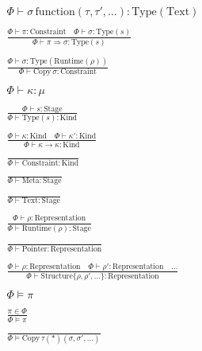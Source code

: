 \documentclass {article}
\begin{document}
\begin{gather*}
{\Phi \vdash \sigma \, \text{function} (\tau, \tau', \dots) : \text{Type} (\text{Text})} \\
\\
\frac
{\Phi \vdash \pi : \text{Constraint} \quad \Phi \vdash \sigma : \text{Type}(s)}
{\Phi \vdash \pi \Rightarrow \sigma : \text{Type}(s)} \\
\\
\frac
{\Phi \vdash \sigma : \text{Type}(\text{Runtime}(\rho))}
{\Phi \vdash \text{Copy} \, \sigma : \text{Constraint}} \\
\\
\Phi \vdash \kappa : \mu \tag*{[Kind Validation]} \\
\\
\frac
{\Phi \vdash s : \text{Stage}}
{\Phi \vdash \text {Type} (s) : \text{Kind}} \\
\\
\frac
{\Phi \vdash \kappa : \text{Kind} \quad \Phi \vdash \kappa' : \text{Kind}}
{\Phi \vdash \kappa \to \kappa : \text{Kind} } \\
\\
\frac
{}
{\Phi \vdash \text{Constraint} : \text{Kind}} \\
\\
\frac
{}
{\Phi \vdash \text{Meta} : \text{Stage}} \\
\\
\frac
{}
{\Phi \vdash \text{Text} : \text{Stage}} \\
\\
\frac
{\Phi \vdash \rho : \text{Representation}}
{\Phi \vdash \text{Runtime} (\rho) : \text{Stage}} \\
\\
\frac
{}
{\Phi \vdash \text{Pointer} : \text{Representation}} \\
\\
\frac
{\Phi \vdash \rho : \text{Representation} \quad \Phi \vdash \rho' : \text{Representation} \quad \dots}
{\Phi \vdash \text{Structure} \{ \rho, \rho', \dots \} : \text{Representation} } \\
\\
\Phi \models \pi \tag*{[Qualified Validation]} \\
\\
\frac
{\pi \in \Phi}
{\Phi \models \pi} \\
\\
\frac
{}
{\Phi \models \text{Copy} \, \tau(*)(\sigma, \sigma', \dots)}
\end{gather*}
\end{document}
